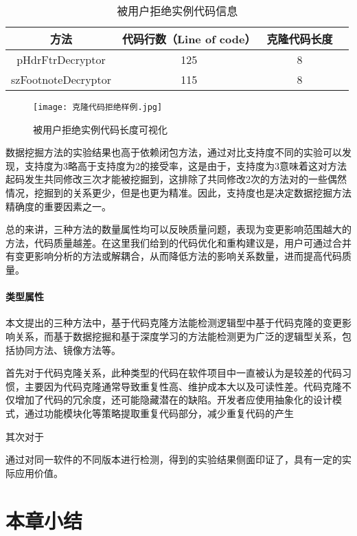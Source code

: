 \begin{table}[htbp]
\caption{被用户拒绝实例代码信息}
\vspace{0.5em}\centering\wuhao
\begin{tabular}{cccc}
\toprule
方法 & 代码行数（Line of code）  & 克隆代码长度\\
\midrule
pHdrFtrDecryptor & 125 & 8 \\
szFootnoteDecryptor  & 115 & 8 \\
\bottomrule
\end{tabular}
\end{table}

\begin{figure}[h]
\centering
\texttt{[image: 克隆代码拒绝样例.jpg]}
\caption{被用户拒绝实例代码长度可视化}
\end{figure}

数据挖掘方法的实验结果也高于依赖闭包方法，通过对比支持度不同的实验可以发现，支持度为3略高于支持度为2的接受率，这是由于，支持度为3意味着这对方法起码发生共同修改三次才能被挖掘到，这排除了共同修改2次的方法对的一些偶然情况，挖掘到的关系更少，但是也更为精准。因此，支持度也是决定数据挖掘方法精确度的重要因素之一。

总的来讲，三种方法的数量属性均可以反映质量问题，表现为变更影响范围越大的方法，代码质量越差。在这里我们给到的代码优化和重构建议是，用户可通过合并有变更影响分析的方法或解耦合，从而降低方法的影响关系数量，进而提高代码质量。


\paragraph{类型属性} 本文提出的三种方法中，基于代码克隆方法能检测逻辑型中基于代码克隆的变更影响关系，而基于数据挖掘和基于深度学习的方法能检测更为广泛的逻辑型关系，包括协同方法、镜像方法等。

首先对于代码克隆关系，此种类型的代码在软件项目中一直被认为是较差的代码习惯，主要因为代码克隆通常导致重复性高、维护成本大以及可读性差。代码克隆不仅增加了代码的冗余度，还可能隐藏潜在的缺陷。开发者应使用抽象化的设计模式，通过功能模块化等策略提取重复代码部分，减少重复代码的产生

其次对于


通过对同一软件的不同版本进行检测，得到的实验结果侧面印证了，具有一定的实际应用价值。

\section{本章小结}

